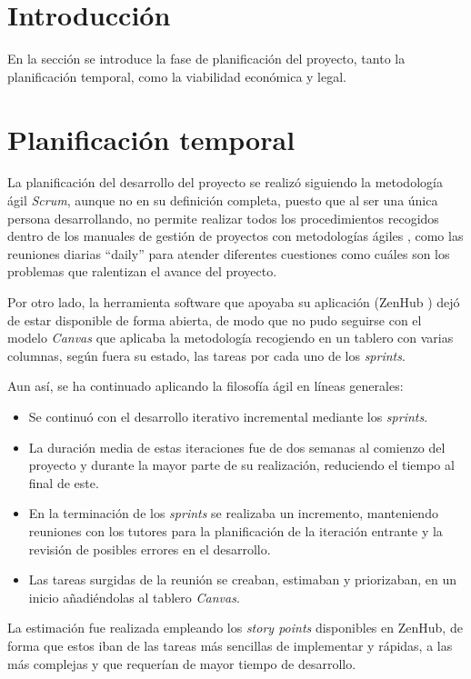 
\section{Introducción}
En la sección se introduce la fase de planificación del proyecto, tanto la planificación temporal, como
la viabilidad económica y legal.

\section{Planificación temporal}
La planificación del desarrollo del proyecto se realizó siguiendo la metodología ágil \textit{Scrum}, aunque no en su definición completa, puesto
que al ser una única persona desarrollando, no permite realizar todos los procedimientos recogidos dentro de los manuales de gestión de proyectos
con metodologías ágiles \cite{book:palacio2021}, como las reuniones diarias ``daily'' para atender diferentes cuestiones como cuáles son los 
problemas que ralentizan el avance del proyecto.

Por otro lado, la herramienta software que apoyaba su aplicación (ZenHub \cite{misc:zenhub2023}) dejó de estar disponible de forma abierta, de modo
que no pudo seguirse con el modelo \textit{Canvas} que aplicaba la metodología recogiendo en un tablero con varias columnas, según fuera su estado, las 
tareas por cada uno de los \textit{sprints}.

Aun así, se ha continuado aplicando la filosofía ágil en líneas generales:
\begin{itemize}
    \item Se continuó con el desarrollo iterativo incremental mediante los \textit{sprints}.
    \item La duración media de estas iteraciones fue de dos semanas al comienzo del proyecto y durante
        la mayor parte de su realización, reduciendo el tiempo al final de este.
    \item En la terminación de los \textit{sprints} se realizaba un incremento, manteniendo reuniones con los 
        tutores para la planificación de la iteración entrante y la revisión de posibles errores en el desarrollo.
    \item Las tareas surgidas de la reunión se creaban, estimaban y priorizaban, en un inicio añadiéndolas al tablero
        \textit{Canvas}.
\end{itemize}

La estimación fue realizada empleando los \textit{story points} disponibles en ZenHub, de forma que estos iban de las 
tareas más sencillas de implementar y rápidas, a las más complejas y que requerían de mayor tiempo
de desarrollo.

